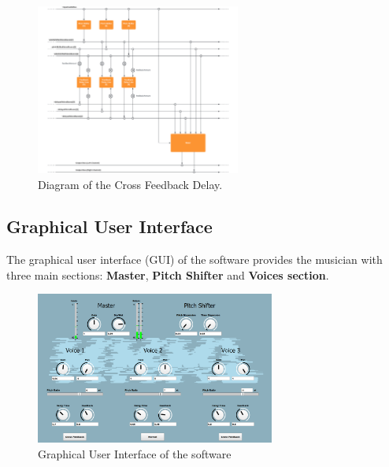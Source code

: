 \documentclass{article}
\begin{document}
\begin{figure}[H]
\centering
  \includegraphics[width=0.6\textwidth]{Cross_Feedback.png}
    \caption{Diagram of the Cross Feedback Delay.}
\end{figure}

\subsection{Graphical User Interface}
The graphical user interface (GUI) of the software provides the musician with three main sections:
\textbf{Master}, \textbf{Pitch Shifter} and  \textbf{Voices section}.

\begin{figure}[H]
    \centering
    \includegraphics[width=0.7\textwidth]{GuiOverview.png}
    \caption{Graphical User Interface of the software}
\end{figure}
\end{document}
